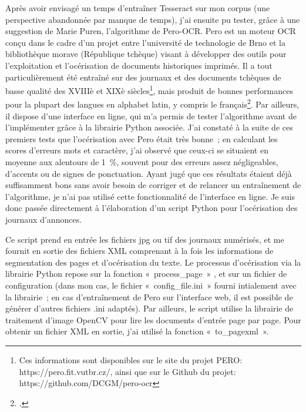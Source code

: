 Après avoir envisagé un temps d’entraîner Tesseract sur mon corpus (une perspective abandonnée par manque de temps), j’ai ensuite pu tester, grâce à une suggestion de Marie Puren, l’algorithme de Pero-OCR. Pero est un moteur OCR conçu dans le cadre d’un projet entre l’université de technologie de Brno et la bibliothèque morave (République tchèque) visant à développer des outils pour l’exploitation et l’océrisation de documents historiques imprimés. Il a tout particulièrement été entraîné sur des journaux et des documents tchèques de basse qualité des XVIIIè et XIXè siècles\footnote{Ces informations sont disponibles sur le site du projet PERO: https://pero.fit.vutbr.cz/, ainsi que sur le Github du projet: https://github.com/DCGM/pero-ocr}, mais produit de bonnes performances pour la plupart des langues en alphabet latin, y compris le français\footcites{birkholzEvaluatingMultilingualCapabilities2021}. Par ailleurs, il dispose d’une interface en ligne, qui m’a permis de tester l’algorithme avant de l’implémenter grâce à la librairie Python associée. J’ai constaté à la suite de ces premiers tests que l’océrisation avec Pero était très bonne ; en calculant les scores d’erreurs mots et caractère, j’ai observé que ceux-ci se situaient en moyenne aux alentours de 1 \%, souvent pour des erreurs assez négligeables, d’accents ou de signes de ponctuation. Ayant jugé que ces résultats étaient déjà suffisamment bons sans avoir besoin de corriger et de relancer un entraînement de l'algorithme, je n’ai pas utilisé cette fonctionnalité de l’interface en ligne. Je suis donc passée directement à l’élaboration d’un script Python pour l’océrisation des journaux d’annonces.


Ce script prend en entrée les fichiers jpg ou tif des journaux numérisés, et me fournit en sortie des fichiers XML comprenant à la fois les informations de segmentation des pages et d’océrisation du texte. Le processus d’océrisation via la librairie Python repose sur la fonction « process\_page » , et sur un fichier de configuration (dans mon cas, le fichier « config\_file.ini » fourni intialement avec la librairie ; en cas d’entraînement de Pero sur l’interface web, il est possible de générer d’autres fichiers .ini adaptés). Par ailleurs, le script utilise la librairie de traitement d’image OpenCV pour lire les documents d’entrée page par page. Pour obtenir un fichier XML en sortie, j’ai utilisé la fonction « to\_pagexml ». 

\bigskip

